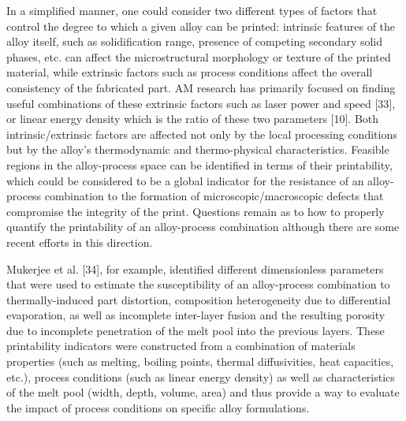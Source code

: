 \documentclass[10pt]{article}
\begin{document}
In a simplified manner, one could consider two different types of factors that control the degree to which a given alloy can be printed: intrinsic features of the alloy itself, such as solidification range, presence of competing secondary solid phases, etc. can affect the microstructural morphology or texture of the printed material, while extrinsic factors such as process conditions affect the overall consistency of the fabricated part. AM research has primarily focused on finding useful combinations of these extrinsic factors such as laser power and speed [33], or linear energy density which is the ratio of these two parameters [10]. Both intrinsic/extrinsic factors are affected not only by the local processing conditions but by the alloy's thermodynamic and thermo-physical characteristics. Feasible regions in the alloy-process space can be identified in terms of their printability, which could be considered to be a global indicator for the resistance of an alloy-process combination to the formation of microscopic/macroscopic defects that compromise the integrity of the print. Questions remain as to how to properly quantify the printability of an alloy-process combination although there are some recent efforts in this direction.

Mukerjee et al. [34], for example, identified different dimensionless parameters that were used to estimate the susceptibility of an alloy-process combination to thermally-induced part distortion, composition heterogeneity due to differential evaporation, as well as incomplete inter-layer fusion and the resulting porosity due to incomplete penetration of the melt pool into the previous layers. These printability indicators were constructed from a combination of materials properties (such as melting, boiling points, thermal diffusivities, heat capacities, etc.), process conditions (such as linear energy density) as well as characteristics of the melt pool (width, depth, volume, area) and thus provide a way to evaluate the impact of process conditions on specific alloy formulations.
\end{document}
